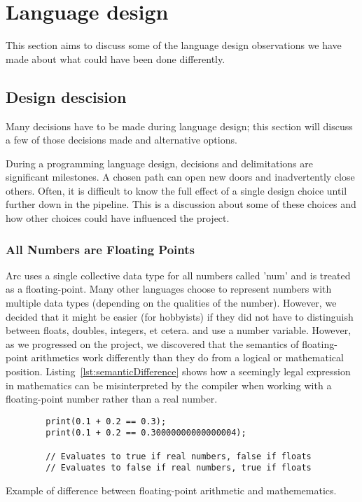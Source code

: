 \section{Language design}\label{sec:discussion_languageDesign}

This section aims to discuss some of the language design observations we have made about what could have been done differently.

\subsection{Design descision}

Many decisions have to be made during language design; this section will discuss a few of those decisions made and alternative options.

During a programming language design, decisions and delimitations are significant milestones. A chosen path can open new doors and inadvertently close others. Often, it is difficult to know the full effect of a single design choice until further down in the pipeline. This is a discussion about some of these choices and how other choices could have influenced the project.

\subsubsection{All Numbers are Floating Points}

Arc uses a single collective data type for all numbers called 'num' and is treated as a floating-point. Many other languages choose to represent numbers with multiple data types (depending on the qualities of the number). However, we decided that it might be easier (for hobbyists) if they did not have to distinguish between floats, doubles, integers, et cetera. and use a number variable. However, as we progressed on the project, we discovered that the semantics of floating-point arithmetics work differently than they do from a logical or mathematical position. Listing~\ref{lst:semanticDifference} shows how a seemingly legal expression in mathematics can be misinterpreted by the compiler when working with a floating-point number rather than a real number.

\begin{listing}[htb!]
    \begin{verbatim}
        print(0.1 + 0.2 == 0.3);
        print(0.1 + 0.2 == 0.30000000000000004);

        // Evaluates to true if real numbers, false if floats
        // Evaluates to false if real numbers, true if floats
    \end{verbatim}
    \caption{Example of difference between floating-point arithmetic and mathemematics.}
    \label{lst:semanticDifference}
\end{listing}

